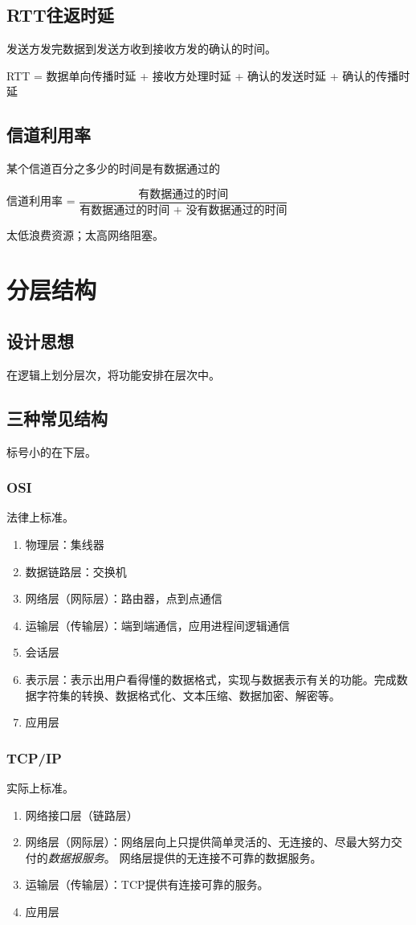 \subsection{RTT往返时延}
发送方发完数据到发送方收到接收方发的确认的时间。

RTT = 数据单向传播时延 + 接收方处理时延 + 确认的发送时延 + 确认的传播时延


\subsection{信道利用率}
某个信道百分之多少的时间是有数据通过的

信道利用率 = \(\dfrac{\text{有数据通过的时间}}{\text{有数据通过的时间 + 没有数据通过的时间}}\)

太低浪费资源；太高网络阻塞。


\section{分层结构}

\subsection{设计思想}
在逻辑上划分层次，将功能安排在层次中。


\subsection{三种常见结构}
标号小的在下层。

\subsubsection{OSI}
法律上标准。
\begin{enumerate}
    \item 物理层：集线器
    \item 数据链路层：交换机
    \item 网络层（网际层）：路由器，点到点通信
    \item 运输层（传输层）：端到端通信，应用进程间逻辑通信
    \item 会话层
    \item 表示层：表示出用户看得懂的数据格式，实现与数据表示有关的功能。完成数据字符集的转换、数据格式化、文本压缩、数据加密、解密等。
    \item 应用层
\end{enumerate}


\subsubsection{TCP/IP}
实际上标准。
\begin{enumerate}
    \item 网络接口层（链路层）
    \item 网络层（网际层）：网络层向上只提供简单灵活的、无连接的、尽最大努力交付的\textit{数据报服务}。
    网络层提供的无连接不可靠的数据服务。
    \item 运输层（传输层）：TCP提供有连接可靠的服务。
    \item 应用层
\end{enumerate}


